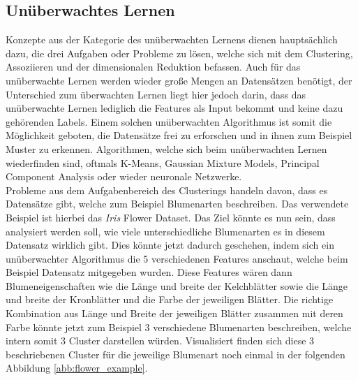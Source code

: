 \documentclass[]{iat}
\begin{document}
\subsection{Unüberwachtes Lernen} \label{sec:unueberwachtes_lernen}
Konzepte aus der Kategorie des unüberwachten Lernens dienen hauptsächlich dazu, die drei Aufgaben oder Probleme zu lösen, welche sich mit dem Clustering, Assoziieren und der dimensionalen Reduktion befassen. Auch für das unüberwachte Lernen werden wieder große Mengen an Datensätzen benötigt, der Unterschied zum überwachten Lernen liegt hier jedoch darin, dass das unüberwachte Lernen lediglich die Features als Input bekommt und keine dazu gehörenden Labels. Einem solchen unüberwachten Algorithmus ist somit die Möglichkeit geboten, die Datensätze frei zu erforschen und in ihnen zum Beispiel Muster zu erkennen. Algorithmen, welche sich beim unüberwachten Lernen wiederfinden sind, oftmals K-Means, Gaussian Mixture Models, Principal Component Analysis oder wieder neuronale Netzwerke.\\
Probleme aus dem Aufgabenbereich des Clusterings handeln davon, dass es Datensätze gibt, welche zum Beispiel Blumenarten beschreiben. Das verwendete Beispiel ist hierbei das \textit{Iris} Flower Dataset. \cite[]{Dua:2019} Das Ziel könnte es nun sein, dass analysiert werden soll, wie viele unterschiedliche Blumenarten es in diesem Datensatz wirklich gibt. Dies könnte jetzt dadurch geschehen, indem sich ein unüberwachter Algorithmus die 5 verschiedenen Features anschaut, welche beim Beispiel Datensatz mitgegeben wurden. Diese Features wären dann Blumeneigenschaften wie die Länge und breite der Kelchblätter sowie die Länge und breite der Kronblätter und die Farbe der jeweiligen Blätter. Die richtige Kombination aus Länge und Breite der jeweiligen Blätter zusammen mit deren Farbe könnte jetzt zum Beispiel 3 verschiedene Blumenarten beschreiben, welche intern somit 3 Cluster darstellen würden. Visualisiert finden sich diese 3 beschriebenen Cluster für die jeweilige Blumenart noch einmal in der folgenden Abbildung \ref{abb:flower_example}.
\end{document}
